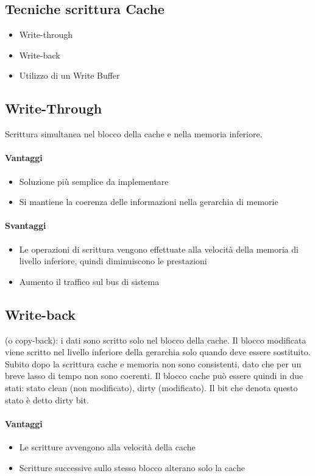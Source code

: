 \documentclass[12pt, a4paper, openany]{book}
\begin{document}
\subsection*{Tecniche scrittura Cache}
\begin{itemize}
    \item Write-through
    \item Write-back
    \item Utilizzo di un Write Buffer
\end{itemize}

\subsection*{Write-Through} Scrittura simultanea nel blocco della cache e nella
memoria inferiore.
\paragraph*{Vantaggi} 
\begin{itemize}
    \item Soluzione più semplice da implementare
    \item Si mantiene la coerenza delle informazioni nella gerarchia di memorie
\end{itemize} 

\paragraph*{Svantaggi}
\begin{itemize}
    \item Le operazioni di scrittura vengono effettuate alla velocità della memoria
    di livello inferiore, quindi diminuiscono le prestazioni
    \item Aumento il traffico sul bus di sistema
\end{itemize}

\subsection*{Write-back} (o copy-back): i dati sono scritto solo nel blocco della cache.
Il blocco modificata viene scritto nel livello inferiore della gerarchia solo quando
deve essere sostituito. Subito dopo la scrittura cache e memoria non sono consistenti,
dato che per un breve lasso di tempo non sono coerenti.
Il blocco cache può essere quindi in due stati: stato clean (non modificato), dirty (modificato).
Il bit che denota questo stato è detto dirty bit.
\paragraph*{Vantaggi}
\begin{itemize}
    \item Le scritture avvengono alla velocità della cache
    \item Scritture successive sullo stesso blocco alterano solo la cache
\end{itemize}
\end{document}
